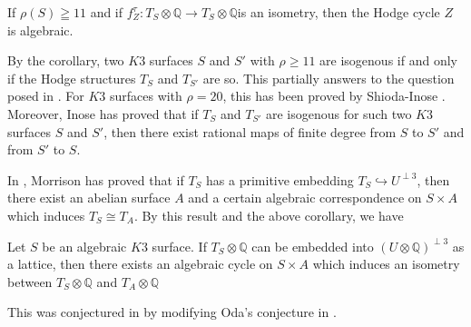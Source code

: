 \begin{cor}\label{cor1.10}
If $\rho(S)\geqq 11$ and if $f^{\tau}_Z:T_S\otimes \mathbb{Q}\to
T_S\otimes \mathbb{Q}$\pageoriginale is an isometry, then the Hodge cycle $Z$ is
algebraic. 
\end{cor}

\begin{remark}\label{remark1.11}
By the corollary, two $K3$ surfaces $S$ and $S'$ with $\rho\geq 11$
are isogenous if and only if the Hodge structures $T_S$ and $T_{S'}$ are
so. This partially answers to the question posed in \cite{key21}. For
$K3$ surfaces with $\rho=20$, this has been proved by Shioda-Inose
\cite{key22}. Moreover, Inose \cite{key4} has proved that if $T_S$ and
$T_{S'}$ are isogenous for such two $K3$ surfaces $S$ and $S'$, then
there exist rational maps of finite degree from $S$ to $S'$ and from
$S'$ to $S$. 

In \cite{key10}, Morrison has proved that if $T_S$ has a primitive
embedding $T_S\hookrightarrow U^{\perp 3}$, then there exist an
abelian surface $A$ and a certain algebraic correspondence on $S\times
A$ which induces $T_S\cong T_A$. By this result and the above
corollary, we have 
\end{remark}

\begin{Theorem}\label{Theorem1.12}
Let $S$ be an algebraic $K3$ surface. If $T_S\otimes \mathbb{Q}$ can
be embedded into $(U\otimes \mathbb{Q})^{\perp 3}$ as a lattice, then
there exists an algebraic cycle on $S \times A$ which induces an
isometry between $T_S\otimes \mathbb{Q}$ and $T_A\otimes \mathbb{Q}$ 
\end{Theorem}

This was conjectured in \cite{key10} by modifying Oda's conjecture in
\cite{key19}.

